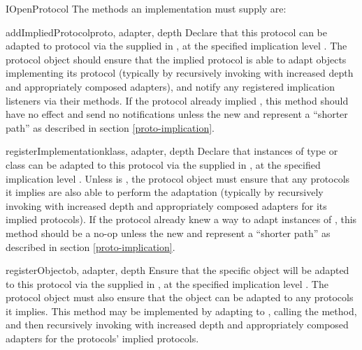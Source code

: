 \begin{verbatim%
}
\begin{verbatim%
}
\begin{verbatim%
}
\begin{verbatim%
}
\begin{classdesc*}{IOpenProtocol}
The methods an  implementation must supply are:


\begin{methoddesc}{addImpliedProtocol}{proto, adapter, depth}
Declare that this protocol can be adapted to protocol  via the
 supplied in , at the specified implication
level .  The protocol object should ensure that the implied protocol
is able to adapt objects implementing its protocol (typically by recursively
invoking  with increased depth and
appropriately composed adapters), and notify any registered implication
listeners via their  methods.  If the protocol
already implied , this method should have no effect and send no
notifications unless the new  and  represent a
``shorter path'' as described in section \ref{proto-implication}.
\end{methoddesc}


\begin{methoddesc}{registerImplementation}{klass, adapter, depth}
Declare that instances of type or class  can be adapted to this
protocol via the  supplied in , at the
specified implication level .  Unless  is
, the protocol object must ensure that
any protocols it implies are also able to perform the adaptation (typically
by recursively invoking  with increased depth
and appropriately composed adapters for its implied protocols).  If the
protocol already knew a way to adapt instances of , this method
should be a no-op unless the new  and  represent a
``shorter path'' as described in section \ref{proto-implication}.
\end{methoddesc}






\begin{methoddesc}{registerObject}{ob, adapter, depth}
Ensure that the specific object  will be adapted to this protocol via
the  supplied in , at the specified
implication level .  The protocol object must also ensure that the
object can be adapted to any protocols it implies.  This method may be
implemented by adapting  to , calling the
 method, and then recursively invoking
 with increased depth and appropriately
composed adapters for the protocols' implied protocols.
\end{methoddesc}


\end{classdesc*}
\end{verbatim%
}
\end{verbatim%
}
\end{verbatim%
}
\end{verbatim%
}
